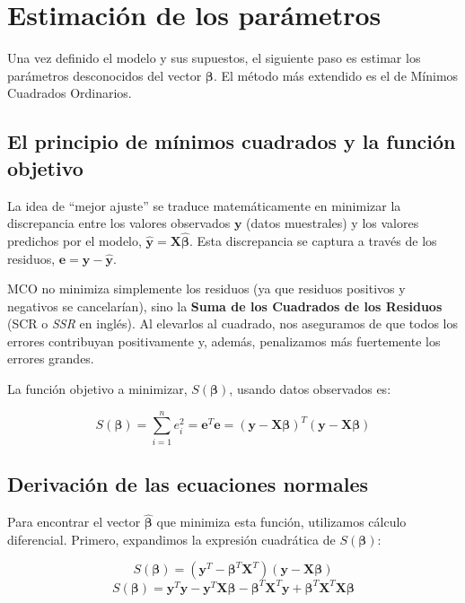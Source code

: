 \documentclass[
  letterpaper,
  DIV=11,
  numbers=noendperiod]{scrreprt}
\begin{document}
\section{Estimación de los
parámetros}\label{estimaciuxf3n-de-los-paruxe1metros-1}

Una vez definido el modelo y sus supuestos, el siguiente paso es estimar
los parámetros desconocidos del vector \(\boldsymbol{\beta}\). El método
más extendido es el de Mínimos Cuadrados Ordinarios.

\subsection{El principio de mínimos cuadrados y la función
objetivo}\label{el-principio-de-muxednimos-cuadrados-y-la-funciuxf3n-objetivo}

La idea de ``mejor ajuste'' se traduce matemáticamente en minimizar la
discrepancia entre los valores observados \(\mathbf{y}\) (datos
muestrales) y los valores predichos por el modelo,
\(\hat{\mathbf{y}} = \mathbf{X}\hat{\boldsymbol{\beta}}\). Esta
discrepancia se captura a través de los residuos,
\(\mathbf{e} = \mathbf{y} - \hat{\mathbf{y}}\).

MCO no minimiza simplemente los residuos (ya que residuos positivos y
negativos se cancelarían), sino la \textbf{Suma de los Cuadrados de los
Residuos} (SCR o \emph{SSR} en inglés). Al elevarlos al cuadrado, nos
aseguramos de que todos los errores contribuyan positivamente y, además,
penalizamos más fuertemente los errores grandes.

La función objetivo a minimizar, \(S(\boldsymbol{\beta})\), usando datos
observados es:

\[S(\boldsymbol{\beta}) = \sum_{i=1}^n e_i^2 = \mathbf{e}^T\mathbf{e} = (\mathbf{y} - \mathbf{X}\boldsymbol{\beta})^T(\mathbf{y} - \mathbf{X}\boldsymbol{\beta})\]

\subsection{Derivación de las ecuaciones
normales}\label{derivaciuxf3n-de-las-ecuaciones-normales}

Para encontrar el vector \(\hat{\boldsymbol{\beta}}\) que minimiza esta
función, utilizamos cálculo diferencial. Primero, expandimos la
expresión cuadrática de \(S(\boldsymbol{\beta})\):

\[S(\boldsymbol{\beta}) = (\mathbf{y}^T - \boldsymbol{\beta}^T\mathbf{X}^T)(\mathbf{y} - \mathbf{X}\boldsymbol{\beta})\]
\[S(\boldsymbol{\beta}) = \mathbf{y}^T\mathbf{y} - \mathbf{y}^T\mathbf{X}\boldsymbol{\beta} - \boldsymbol{\beta}^T\mathbf{X}^T\mathbf{y} + \boldsymbol{\beta}^T\mathbf{X}^T\mathbf{X}\boldsymbol{\beta}\]
\end{document}
